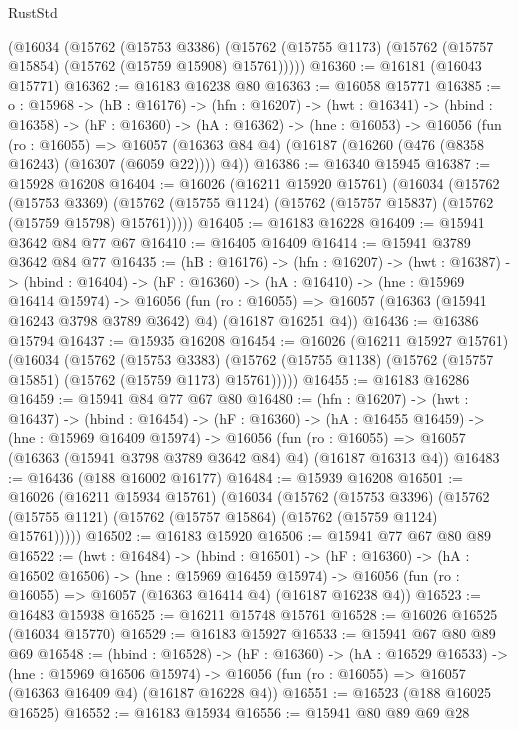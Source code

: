 \begin{lexlean}{RustStd}
\begin{coremodule}
    (@16034
      (@15762
        (@15753 @3386)
        (@15762 (@15755 @1173) (@15762 (@15757 @15854) (@15762 (@15759 @15908) @15761)))))
@16360 := @16181 (@16043 @15771)
@16362 := @16183 @16238 @80
@16363 := @16058 @15771
@16385 := {o : @15968} ->
  (hB : @16176) ->
  (hfn : @16207) ->
  (hwt : @16341) ->
  (hbind : @16358) ->
  (hF : @16360) ->
  (hA : @16362) ->
  (hne : @16053) ->
  @16056
    (fun (ro : @16055) =>
    @16057 (@16363 @84 @4) (@16187 (@16260 (@476 (@8358 @16243) (@16307 (@6059 @22)))) @4))
@16386 := @16340 @15945
@16387 := @15928 @16208
@16404 := @16026
    (@16211 @15920 @15761)
    (@16034
      (@15762
        (@15753 @3369)
        (@15762 (@15755 @1124) (@15762 (@15757 @15837) (@15762 (@15759 @15798) @15761)))))
@16405 := @16183 @16228
@16409 := @15941 @3642 @84 @77 @67
@16410 := @16405 @16409
@16414 := @15941 @3789 @3642 @84 @77
@16435 := (hB : @16176) ->
  (hfn : @16207) ->
  (hwt : @16387) ->
  (hbind : @16404) ->
  (hF : @16360) ->
  (hA : @16410) ->
  (hne : @15969 @16414 @15974) ->
  @16056
    (fun (ro : @16055) => @16057 (@16363 (@15941 @16243 @3798 @3789 @3642) @4) (@16187 @16251 @4))
@16436 := @16386 @15794
@16437 := @15935 @16208
@16454 := @16026
    (@16211 @15927 @15761)
    (@16034
      (@15762
        (@15753 @3383)
        (@15762 (@15755 @1138) (@15762 (@15757 @15851) (@15762 (@15759 @1173) @15761)))))
@16455 := @16183 @16286
@16459 := @15941 @84 @77 @67 @80
@16480 := (hfn : @16207) ->
  (hwt : @16437) ->
  (hbind : @16454) ->
  (hF : @16360) ->
  (hA : @16455 @16459) ->
  (hne : @15969 @16409 @15974) ->
  @16056 (fun (ro : @16055) => @16057 (@16363 (@15941 @3798 @3789 @3642 @84) @4) (@16187 @16313 @4))
@16483 := @16436 (@188 @16002 @16177)
@16484 := @15939 @16208
@16501 := @16026
    (@16211 @15934 @15761)
    (@16034
      (@15762
        (@15753 @3396)
        (@15762 (@15755 @1121) (@15762 (@15757 @15864) (@15762 (@15759 @1124) @15761)))))
@16502 := @16183 @15920
@16506 := @15941 @77 @67 @80 @89
@16522 := (hwt : @16484) ->
  (hbind : @16501) ->
  (hF : @16360) ->
  (hA : @16502 @16506) ->
  (hne : @15969 @16459 @15974) ->
  @16056 (fun (ro : @16055) => @16057 (@16363 @16414 @4) (@16187 @16238 @4))
@16523 := @16483 @15938
@16525 := @16211 @15748 @15761
@16528 := @16026 @16525 (@16034 @15770)
@16529 := @16183 @15927
@16533 := @15941 @67 @80 @89 @69
@16548 := (hbind : @16528) ->
  (hF : @16360) ->
  (hA : @16529 @16533) ->
  (hne : @15969 @16506 @15974) ->
  @16056 (fun (ro : @16055) => @16057 (@16363 @16409 @4) (@16187 @16228 @4))
@16551 := @16523 (@188 @16025 @16525)
@16552 := @16183 @15934
@16556 := @15941 @80 @89 @69 @28

\end{coremodule}
\end{lexlean}
